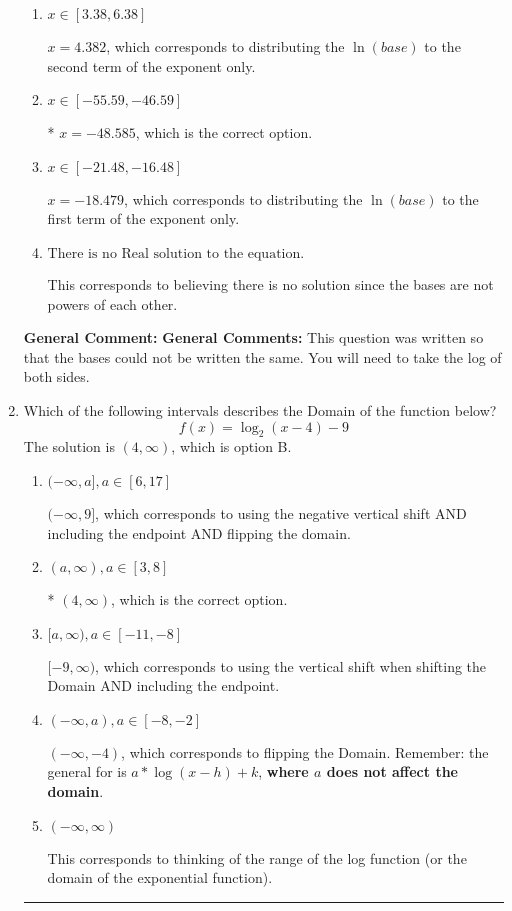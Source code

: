 \documentclass{extbook}[14pt]
\newcommand{\litem}[1]{\item #1

\rule{\textwidth}{0.4pt}}
\begin{document}
\begin{enumerate}
{\begin{enumerate}[label=\Alph*.]
$x = 1.667$, which corresponds to solving the numerators as equal while ignoring the bases are different.
\item \( x \in [3.38, 6.38] \)

$x = 4.382$, which corresponds to distributing the $\ln(base)$ to the second term of the exponent only.
\item \( x \in [-55.59, -46.59] \)

* $x = -48.585$, which is the correct option.
\item \( x \in [-21.48, -16.48] \)

$x = -18.479$, which corresponds to distributing the $\ln(base)$ to the first term of the exponent only.
\item \( \text{There is no Real solution to the equation.} \)

This corresponds to believing there is no solution since the bases are not powers of each other.
\end{enumerate}

\textbf{General Comment:} \textbf{General Comments:} This question was written so that the bases could not be written the same. You will need to take the log of both sides.
}
\litem{
Which of the following intervals describes the Domain of the function below?
\[ f(x) = \log_2{(x-4)}-9 \]The solution is \( (4, \infty) \), which is option B.\begin{enumerate}[label=\Alph*.]
\item \( (-\infty, a], a \in [6, 17] \)

$(-\infty, 9]$, which corresponds to using the negative vertical shift AND including the endpoint AND flipping the domain.
\item \( (a, \infty), a \in [3, 8] \)

* $(4, \infty)$, which is the correct option.
\item \( [a, \infty), a \in [-11, -8] \)

$[-9, \infty)$, which corresponds to using the vertical shift when shifting the Domain AND including the endpoint.
\item \( (-\infty, a), a \in [-8, -2] \)

$(-\infty, -4)$, which corresponds to flipping the Domain. Remember: the general for is $a*\log(x-h)+k$, \textbf{where $a$ does not affect the domain}.
\item \( (-\infty, \infty) \)

This corresponds to thinking of the range of the log function (or the domain of the exponential function).
\end{enumerate}

}
\end{enumerate}
\end{document}
